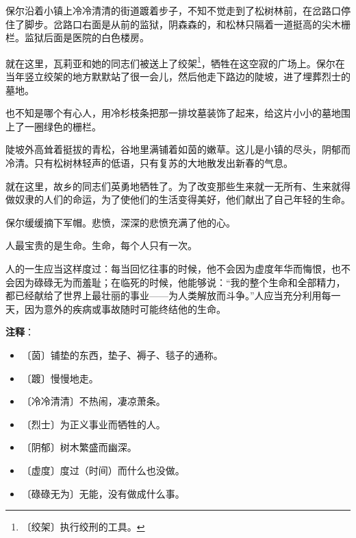 \documentclass[12pt,UTF-8,openany]{ctexbook}
\begin{document}
\begin{normalsize}
    
    保尔沿着小镇上冷冷清清的街道踱着步子，不知不觉走到了松树林前，在岔路口停住了脚步。岔路口右面是从前的监狱，阴森森的，和松林只隔着一道挺高的尖木栅栏。监狱后面是医院的白色楼房。
    
    就在这里，瓦莉亚和她的同志们被送上了绞架\footnote{〔绞架〕执行绞刑的工具。}，牺牲在这空寂的广场上。保尔在当年竖立绞架的地方默默站了很一会儿，然后他走下路边的陡坡，进了埋葬烈士的墓地。
    
    也不知是哪个有心人，用冷杉枝条把那一排坟墓装饰了起来，给这片小小的墓地围上了一圈绿色的栅栏。
    
    陡坡外高耸着挺拔的青松，谷地里满铺着如茵的嫩草。这儿是小镇的尽头，阴郁而冷清。只有松树林轻声的低语，只有复苏的大地散发出新春的气息。
    
    就在这里，故乡的同志们英勇地牺牲了。为了改变那些生来就一无所有、生来就得做奴隶的人们的命运，为了使他们的生活变得美好，他们献出了自己年轻的生命。
    
    保尔缓缓摘下军帽。悲愤，深深的悲愤充满了他的心。
    
    人最宝贵的是生命。生命，每个人只有一次。
    
    人的一生应当这样度过：每当回忆往事的时候，他不会因为虚度年华而悔恨，也不会因为碌碌无为而羞耻；在临死的时候，他能够说：“我的整个生命和全部精力，都已经献给了世界上最壮丽的事业——为人类解放而斗争。”人应当充分利用每一天，因为意外的疾病或事故随时可能终结他的生命。
    
\end{normalsize}


\newpage

\textbf{注释}：

\vspace{-1em}

\begin{itemize}
    \setlength\itemsep{-0.2em}
    \item 〔茵〕铺垫的东西，垫子、褥子、毯子的通称。
    \item 〔踱〕慢慢地走。
    \item 〔冷冷清清〕不热闹，凄凉萧条。
    \item 〔烈士〕为正义事业而牺牲的人。
    \item 〔阴郁〕树木繁盛而幽深。
    \item 〔虚度〕度过（时间）而什么也没做。
    \item 〔碌碌无为〕无能，没有做成什么事。
\end{itemize}
\end{document}
